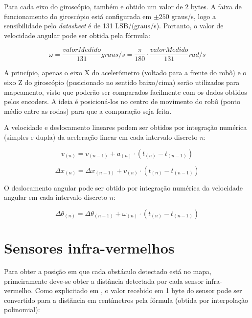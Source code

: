 Para cada eixo do giroscópio, também e obtido um valor de 2 bytes. A faixa de funcionamento do giroscópio está configurada em $\pm 250$ graus/s, logo a sensibilidade pelo \textit{datasheet} é de 131 LSB/(graus/s). Portanto, o valor de velocidade angular pode ser obtida pela fórmula:

\begin{equation}
  \omega = \frac{valorMedido}{131} \unit{graus/s} = \frac{\pi}{180} \cdot \frac{valorMedido}{131} \unit{rad/s}
  \label{eq:giro}
\end{equation}


A princípio, apenas o eixo X do acelerômetro (voltado para a frente do robô) e o eixo Z do giroscópio (posicionado no sentido baixo/cima) serão utilizados para mapeamento, visto que poderão ser comparados facilmente com os dados obtidos pelos encoders. A ideia é posicioná-los no centro de movimento do robô (ponto médio entre as rodas) para que a comparação seja feita.

A velocidade e deslocamento lineares podem ser obtidos por integração numérica (simples e dupla) da aceleração linear em cada intervalo discreto $n$:

\begin{equation}
  v_{(n)} = v_{(n - 1)} + a_{(n)} \cdot (t_{(n)} - t_{(n-1)})
  \label{eq:v_acel}
\end{equation}

\begin{equation}
  \Delta x_{(n)} = \Delta x_{(n - 1)} + v_{(n)} \cdot (t_{(n)} - t_{(n-1)})
  \label{eq:v_acel}
\end{equation}

O deslocamento angular pode ser obtido por integração numérica da velocidade angular em cada intervalo discreto $n$:

\begin{equation}
  \Delta \theta_{(n)} = \Delta \theta_{(n - 1)} + \omega_{(n)} \cdot (t_{(n)} - t_{(n-1)})
  \label{eq:v_acel}
\end{equation}



\section{Sensores infra-vermelhos}

Para obter a posição em que cada obstáculo detectado está no mapa, primeiramente deve-se obter a distância detectada por cada sensor infra-vermelho. Como explicitado em \cite{bellator_2012}, o valor recebido em 1 byte do sensor pode ser convertido para a distãncia em centímetros pela fórmula (obtida por interpolação polinomial):

